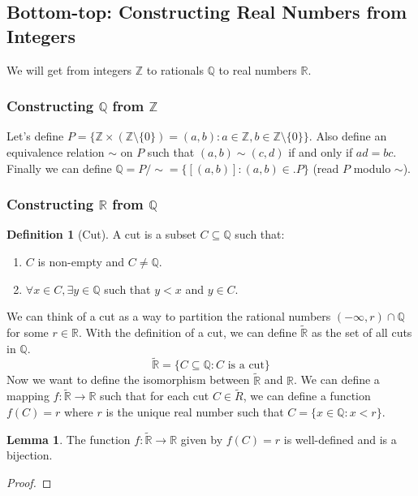 \documentclass[letterpaper, 11pt]{article}
\newcommand{\R}{\mathbb{R}}   %
\newcommand{\Q}{\mathbb{Q}}   %
\newcommand{\Z}{\mathbb{Z}}   %
\newcommand{\1}{\mathds{1}}		%
\theoremstyle{definition}
\newtheorem{lemma}[theorem]{Lemma}
\newtheorem{definition}[theorem]{Definition}
\begin{document}
\subsection{Bottom-top: Constructing Real Numbers from Integers}
We will get from integers $\Z$ to rationals $\Q$ to real numbers $\R$.
\subsubsection{Constructing \texorpdfstring{$\Q$}{Q} from \texorpdfstring{$\Z$}{Z}}

Let's define $P = \{ \Z \times (\Z \setminus \{0\}) = (a,b) : a \in \Z, b \in \Z \setminus \{0\} \}$. Also define an equivalence relation $\sim$ on $P$ such that $(a,b) \sim (c,d)$ if and only if $ad = bc$.\\
Finally we can define $\Q = P / \sim = \{[(a,b)] : (a,b) \in. P\}$ (read $P$ modulo $\sim$).

\subsubsection{Constructing \texorpdfstring{$\R$}{R} from \texorpdfstring{$\Q$}{Q}}

\begin{definition}[Cut]
    A cut is a subset $C \subseteq \Q$ such that:
    \begin{enumerate}
        \item $C$ is non-empty and $C \neq \Q$.
        \item $\forall x \in C, \exists y \in \Q$ such that $y < x$ and $y \in C$.
    \end{enumerate}
\end{definition}
We can think of a cut as a way to partition the rational numbers $( -\infty, r) \cap \Q$ for some $r \in \R$.
With the definition of a cut, we can define $\tilde{\R}$ as the set of all cuts in $\Q$. 
\[
    \tilde{\R} = \{ C \subseteq \Q : C \text{ is a cut} \}
\]
Now we want to define the isomorphism between $\tilde{\R}$ and $\R$. We can define a mapping $f: \tilde{\R} \to \R$ such that for each cut $C \in \tilde{R}$, we can define a function $f(C) = r$ where $r$ is the unique real number such that $C = \{ x \in \Q : x < r \}$.
\begin{lemma} 
    The function $f : \tilde{\R} \to \R$ given by $f(C) = r$ is well-defined and is a bijection.
\end{lemma}
\begin{proof}

\end{proof}

% 
% 

\end{document}
